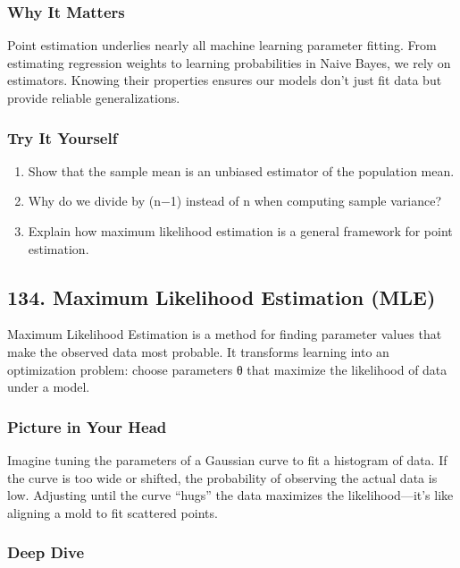 \documentclass[
  letterpaper,
  DIV=11,
  numbers=noendperiod]{scrreprt}
\providecommand{\tightlist}{%
  \setlength{\itemsep}{0pt}\setlength{\parskip}{0pt}}
\begin{document}
\subsubsection{Why It Matters}\label{why-it-matters-30}

Point estimation underlies nearly all machine learning parameter
fitting. From estimating regression weights to learning probabilities in
Naive Bayes, we rely on estimators. Knowing their properties ensures our
models don't just fit data but provide reliable generalizations.

\subsubsection{Try It Yourself}\label{try-it-yourself-132}

\begin{enumerate}
\def\labelenumi{\arabic{enumi}.}
\tightlist
\item
  Show that the sample mean is an unbiased estimator of the population
  mean.
\item
  Why do we divide by (n−1) instead of n when computing sample variance?
\item
  Explain how maximum likelihood estimation is a general framework for
  point estimation.
\end{enumerate}

\subsection{134. Maximum Likelihood Estimation
(MLE)}\label{maximum-likelihood-estimation-mle}

Maximum Likelihood Estimation is a method for finding parameter values
that make the observed data most probable. It transforms learning into
an optimization problem: choose parameters θ that maximize the
likelihood of data under a model.

\subsubsection{Picture in Your Head}\label{picture-in-your-head-133}

Imagine tuning the parameters of a Gaussian curve to fit a histogram of
data. If the curve is too wide or shifted, the probability of observing
the actual data is low. Adjusting until the curve ``hugs'' the data
maximizes the likelihood---it's like aligning a mold to fit scattered
points.

\subsubsection{Deep Dive}\label{deep-dive-133}
\end{document}
